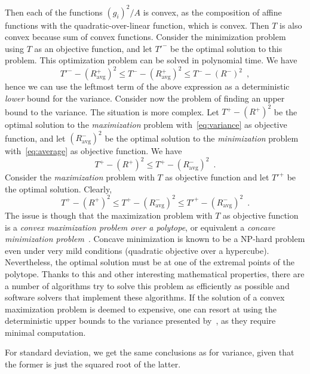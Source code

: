 Then each of the functions $(g_i)^2/A$ is
convex, as the composition of affine functions with the quadratic-over-linear
function, which is convex.%
Then $T$ is also convex because sum of convex functions. Consider the
minimization problem using $T$ as an objective function, and let $T'^-$ be the
optimal solution to this problem. This optimization problem can be solved in
polynomial time.  
We have
\[
T'^--(R^+_{\mathrm{avg}})^2\le T^--(R^+_{\mathrm{avg}})^2\le T^--(R^-)^2\enspace,
\]
hence we can use the leftmost term of the above expression as a deterministic
\emph{lower} bound for the variance. Consider now the problem of finding an
upper bound to the variance. The situation is more complex. Let $T^+-(R^+)^2$ be
the optimal solution to the \emph{maximization} problem with~\eqref{eq:variance}
as objective function, and let $(R^-_\mathrm{avg})^2$ be the optimal solution to
the \emph{minimization} problem with~\eqref{eq:average} as objective function.
We have
\[
T^+-(R^+)^2\le T^+-(R^-_\mathrm{avg})^2\enspace.
\]
Consider the \emph{maximization} problem with $T$ as objective function and let
$T'^+$ be the optimal solution. Clearly,
\[
T^+-(R^+)^2\le T^+-(R^-_\mathrm{avg})^2\le T'^+-(R^-_\mathrm{avg})^2\enspace.
\]
The issue is though that the maximization problem with $T$ as objective
function is a \emph{convex maximization problem over a polytope}, or equivalent a
\emph{concave minimization problem}~\citep{Benson95}. Concave minimization is
known to be a NP-hard problem even under very mild conditions (quadratic
objective over a hypercube). Nevertheless, the optimal solution must be at one
of the extremal points of the polytope. Thanks to this and other interesting
mathematical properties, there are a number of algorithms try to solve this
problem as efficiently as possible and software solvers that implement these
algorithms. If the solution of a convex maximization problem is deemed to
expensive, one can resort at using the deterministic upper bounds to the
variance presented by~\citet{Haas96}, as they require minimal computation.

For standard deviation, we get the same conclusions as for variance, given that
the former is just the squared root of the latter.

